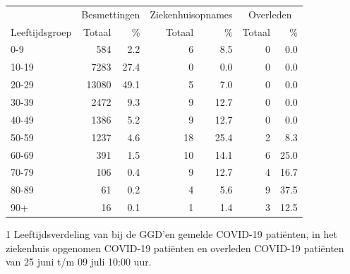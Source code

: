 \documentclass[
  english,
  man,floatsintext]{apa6}
\begin{document}
\begin{table}
\centering\begingroup\fontsize{11}{13}\selectfont

\begin{threeparttable}
\begin{tabular}{lrrrrrr}
\toprule
\multicolumn{1}{c}{ } & \multicolumn{2}{c}{Besmettingen} & \multicolumn{2}{c}{Ziekenhuisopnames} & \multicolumn{2}{c}{Overleden} \\
\cmidrule(l{3pt}r{3pt}){2-3} \cmidrule(l{3pt}r{3pt}){4-5} \cmidrule(l{3pt}r{3pt}){6-7}
Leeftijdsgroep & Totaal & \% & Totaal & \% & Totaal & \%\\
\midrule
0-9 & 584 & 2.2 & 6 & 8.5 & 0 & 0.0\\
10-19 & 7283 & 27.4 & 0 & 0.0 & 0 & 0.0\\
20-29 & 13080 & 49.1 & 5 & 7.0 & 0 & 0.0\\
30-39 & 2472 & 9.3 & 9 & 12.7 & 0 & 0.0\\
40-49 & 1386 & 5.2 & 9 & 12.7 & 0 & 0.0\\
50-59 & 1237 & 4.6 & 18 & 25.4 & 2 & 8.3\\
60-69 & 391 & 1.5 & 10 & 14.1 & 6 & 25.0\\
70-79 & 106 & 0.4 & 9 & 12.7 & 4 & 16.7\\
80-89 & 61 & 0.2 & 4 & 5.6 & 9 & 37.5\\
90+ & 16 & 0.1 & 1 & 1.4 & 3 & 12.5\\
\bottomrule
\end{tabular}
\begin{tablenotes}
\item[1] Leeftijdsverdeling van bij de GGD’en gemelde COVID-19 patiënten, in het ziekenhuis opgenomen COVID-19 patiënten en overleden COVID-19 patiënten van 25 juni t/m 09 juli 10:00 uur.
\end{tablenotes}
\end{threeparttable}
\endgroup{}
\end{table}

\newpage
\end{document}
